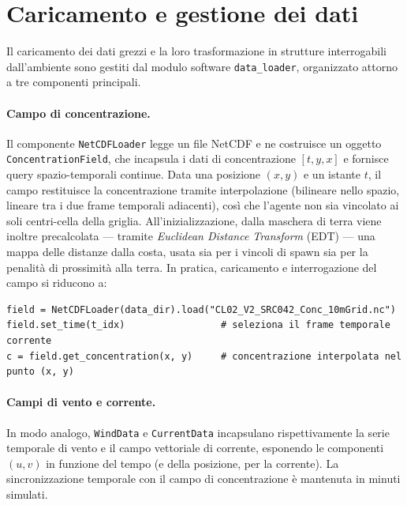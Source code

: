 \section{Caricamento e gestione dei dati}
\label{sec:dataloader}

Il caricamento dei dati grezzi e la loro trasformazione in strutture interrogabili
dall'ambiente sono gestiti dal modulo software \texttt{data\_loader}, organizzato attorno
a tre componenti principali.

\paragraph{Campo di concentrazione.}
Il componente \texttt{NetCDFLoader} legge un file NetCDF e ne costruisce un oggetto
\texttt{ConcentrationField}, che incapsula i dati di concentrazione $[t, y, x]$ e
fornisce query spazio-temporali continue. Data una posizione $(x, y)$ e un istante $t$,
il campo restituisce la concentrazione tramite interpolazione (bilineare nello spazio,
lineare tra i due frame temporali adiacenti), cos\`i che l'agente non sia vincolato ai
soli centri-cella della griglia. All'inizializzazione, dalla maschera di terra viene
inoltre precalcolata --- tramite \emph{Euclidean Distance Transform} (EDT) --- una mappa
delle distanze dalla costa, usata sia per i vincoli di spawn sia per la penalit\`a di
prossimit\`a alla terra. In pratica, caricamento e interrogazione del campo si riducono a:

\begin{lstlisting}
field = NetCDFLoader(data_dir).load("CL02_V2_SRC042_Conc_10mGrid.nc")
field.set_time(t_idx)                 # seleziona il frame temporale corrente
c = field.get_concentration(x, y)     # concentrazione interpolata nel punto (x, y)
\end{lstlisting}

\paragraph{Campi di vento e corrente.}
In modo analogo, \texttt{WindData} e \texttt{CurrentData} incapsulano rispettivamente la
serie temporale di vento e il campo vettoriale di corrente, esponendo le componenti
$(u, v)$ in funzione del tempo (e della posizione, per la corrente). La sincronizzazione
temporale con il campo di concentrazione \`e mantenuta in minuti simulati.

